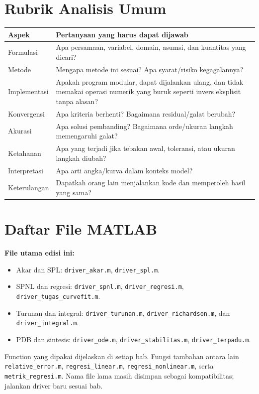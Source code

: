 \documentclass[book,english,noindex,lean,nobackpage,nocopyright,noupdate,nofiglist,notablist]{enacom}
\begin{document}
\chapter*{Rubrik Analisis Umum}
\begin{tabularx}{\textwidth}{p{} X}
\hline
\textbf{Aspek} & \textbf{Pertanyaan yang harus dapat dijawab}\\\hline
Formulasi & Apa persamaan, variabel, domain, asumsi, dan kuantitas yang dicari?\\
Metode & Mengapa metode ini sesuai? Apa syarat/risiko kegagalannya?\\
Implementasi & Apakah program modular, dapat dijalankan ulang, dan tidak memakai operasi numerik yang buruk seperti invers eksplisit tanpa alasan?\\
Konvergensi & Apa kriteria berhenti? Bagaimana residual/galat berubah?\\
Akurasi & Apa solusi pembanding? Bagaimana orde/ukuran langkah memengaruhi galat?\\
Ketahanan & Apa yang terjadi jika tebakan awal, toleransi, atau ukuran langkah diubah?\\
Interpretasi & Apa arti angka/kurva dalam konteks model?\\
Keterulangan & Dapatkah orang lain menjalankan kode dan memperoleh hasil yang sama?\\\hline
\end{tabularx}

\chapter*{Daftar File MATLAB}
\noindent\textbf{File utama edisi ini:}\par
\begin{itemize}
\item Akar dan SPL: \texttt{driver\_akar.m}, \texttt{driver\_spl.m}.
\item SPNL dan regresi: \texttt{driver\_spnl.m}, \texttt{driver\_regresi.m}, \texttt{driver\_tugas\_curvefit.m}.
\item Turunan dan integral: \texttt{driver\_turunan.m}, \texttt{driver\_richardson.m}, dan \texttt{driver\_integral.m}.
\item PDB dan sintesis: \texttt{driver\_ode.m}, \texttt{driver\_stabilitas.m}, \texttt{driver\_terpadu.m}.
\end{itemize}
Function yang dipakai dijelaskan di setiap bab. Fungsi tambahan antara lain \texttt{relative\_error.m}, \texttt{regresi\_linear.m}, \texttt{regresi\_nonlinear.m}, serta \texttt{metrik\_regresi.m}. Nama file lama masih disimpan sebagai kompatibilitas; jalankan driver baru sesuai bab.
\end{document}
